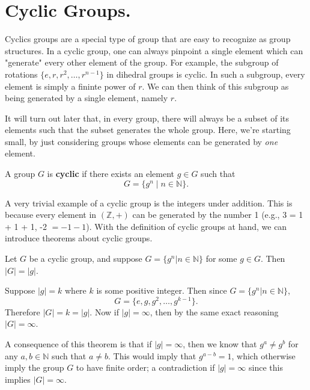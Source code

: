 \documentclass[12pt,letterpaper]{algebra_book}
\theoremstyle{definition}
\begin{document}
    \newpage
    \section{Cyclic Groups.}
    Cyclics groups are a special type of group that are easy to
    recognize as group structures. In a cyclic group, one can always
    pinpoint a single element which can "generate" every other element
    of the group. For example, the subgroup of rotations $\{e, r, r^2,
    \dots, r^{n-1}\}$ in dihedral groups
    is cyclic. In such a subgroup, every element is simply a fininte
    power of $r$. We can then think of this subgroup as
    being generated by a single element, namely $r$.

    It will turn out later that, in every group, there will always be
    a subset of its elements such that the subset generates the whole
    group. Here, we're starting small, by just considering groups
    whose elements can be generated by \textit{one} element.

    \begin{definition}
        A group $G$ is \textbf{cyclic} if there exists an element $g
        \in G$ such that 
        \[
            G = \{g^n \mid n \in \mathbb{N}\}.
        \]
    \end{definition}
    
    A very trivial example of a cyclic group is the integers under
    addition. This is because every element in $(\mathbb{Z}, +)$ can
    be generated by the number 1 (e.g., 3 = 1 + 1 + 1, -2 $= -1 -1$).
    With the definition of cyclic groups at hand, we can introduce
    theorems about cyclic groups.

    \begin{thm}
        Let $G$ be a cyclic group, and suppose $G = \{g^n 
        | n \in \mathbb{N}\}$ for some $g \in G$. Then $|G| = |g|$.
    \end{thm}

    \begin{prf}
        Suppose $|g| = k$ where $k$ is some positive integer. Then 
        since $G = \{g^n | n \in \mathbb{N}\}$, 
        \[
            G = \{e, g, g^2, \dots, g^{k-1}\}.
        \]
        Therefore $|G| = k = |g|$. Now if $|g| = \infty$, then 
        by the same exact reasoning $|G| = \infty$.
    \end{prf}
    A consequence of this theorem is that if $|g| = \infty$, then we
    know that $g^a \ne g^b$ for any $a, b \in \mathbb{N}$ such that $a
    \ne b$. This would imply that $g^{a - b} = 1$, which otherwise 
    imply the group $G$ to have finite order; a contradiction if $|g|
    = \infty$ since this implies $|G| = \infty$.
\end{document}
